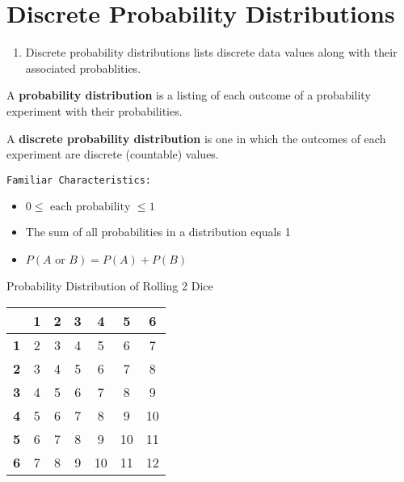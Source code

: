 \documentclass{article}
\begin{document}
\section*{Discrete Probability Distributions}

\begin{tcolorbox}[colframe=orange!70!white, coltitle=black, title=\textbf{Summary}]
\begin{enumerate}
    \item Discrete probability distributions lists discrete data values along with their associated probablities.
\end{enumerate}
\end{tcolorbox}
\vspace{0.75in}

\begin{tcolorbox}[colframe=green!20!black, colback = green!30!white,title=\textbf{Probability Distribution}]
A \textbf{probability distribution} is a listing of each outcome of a probability experiment with their probabilities.
\end{tcolorbox}
\vspace{10pt} 

A {\color{blue}\textbf{discrete probability distribution}} is one in which the outcomes of each experiment are discrete (countable) values.	

\vspace{0.5in}

\texttt{Familiar Characteristics:}
\begin{itemize}
	\item $0 \leq \text{ each probability } \leq 1$
	\item The sum of all probabilities in a distribution equals 1
	\item $P(A \text{ or } B) = P(A) + P(B)$
\end{itemize}

\vspace{0.5in}

Probability Distribution of Rolling 2 Dice
\begin{center}
\begin{tabular}{c|cccccc}
			&	\textbf{1}	&	\textbf{2}	&	\textbf{3}	&	\textbf{4}	&	\textbf{5}	&	\textbf{6}	\\	\hline
\textbf{1}	&		2		&		3		&		4		&		5		&		6		&		7		\\
\textbf{2}	&		3		&		4		&		5		&		6		&		7		&		8		\\
\textbf{3}	&		4		&		5		&		6		&		7		&		8		&		9		\\
\textbf{4}	&		5		&		6		&		7		&		8		&		9		&		10		\\
\textbf{5}	&		6		&		7		&		8		&		9		&		10		&		11		\\
\textbf{6}	&		7		&		8		&		9		&		10		&		11		&		12		\\
\end{tabular}
\end{center}
\end{document}
